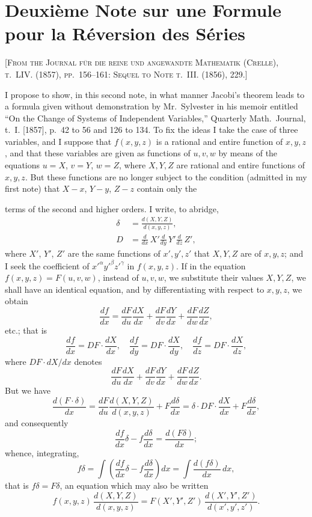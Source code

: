 \documentclass[11pt,a4paper]{book}
\begin{document}
\newpage


\section{Deuxième Note sur une Formule pour la Réversion des Séries}

\textsc{[From the Journal für die reine und angewandte Mathematik (Crelle), t.~LIV. (1857), pp.~156--161: Sequel to Note t.~III. (1856), 229.]}
\label{paper:234}

I propose to show, in this second note, in what manner Jacobi's theorem leads to a formula given without demonstration by Mr.~Sylvester in his memoir entitled ``On the Change of Systems of Independent Variables,'' Quarterly Math.\ Journal, t.~I. [1857], p.~42 to 56 and 126 to 134. To fix the ideas I take the case of three variables, and I suppose that $f(x,y,z)$ is a rational and entire function of $x,y,z$, and that these variables are given as functions of $u,v,w$ by means of the equations $u=X$, $v=Y$, $w=Z$, where $X,Y,Z$ are rational and entire functions of $x,y,z$. But these functions are no longer subject to the condition (admitted in my first note) that $X-x$, $Y-y$, $Z-z$ contain only the

\setcounter{page}{54}

terms of the second and higher orders. I write, to abridge,
\begin{align*}
\delta &= \frac{d(X,Y,Z)}{d(x,y,z)}, \\
D &= \frac{d}{dx}\,X'\frac{d}{dy}\,Y'\frac{d}{dz}\,Z',
\end{align*}
where $X'$, $Y'$, $Z'$ are the same functions of $x',y',z'$ that $X,Y,Z$ are of $x,y,z$; and I seek the coefficient of $x'^\alpha y'^\beta z'^\gamma$ in $f(x,y,z)$. If in the equation $f(x,y,z)=F(u,v,w)$, instead of $u,v,w$, we substitute their values $X,Y,Z$, we shall have an identical equation, and by differentiating with respect to $x,y,z$, we obtain
\[
\frac{df}{dx} = \frac{dF}{du}\frac{dX}{dx} + \frac{dF}{dv}\frac{dY}{dx} + \frac{dF}{dw}\frac{dZ}{dx},
\]
etc.; that is
\[
\frac{df}{dx} = DF \cdot \frac{dX}{dx}, \quad
\frac{df}{dy} = DF \cdot \frac{dX}{dy}, \quad
\frac{df}{dz} = DF \cdot \frac{dX}{dz},
\]
where $DF \cdot dX/dx$ denotes
\[
\frac{dF}{du}\frac{dX}{dx} + \frac{dF}{dv}\frac{dY}{dx} + \frac{dF}{dw}\frac{dZ}{dx}.
\]
But we have
\[
\frac{d(F\cdot\delta)}{dx}
= \frac{dF}{du}\frac{d(X,Y,Z)}{d(x,y,z)} + F\frac{d\delta}{dx}
= \delta \cdot DF\cdot\frac{dX}{dx} + F\frac{d\delta}{dx},
\]
and consequently
\[
\frac{df}{dx}\delta - f\frac{d\delta}{dx} = \frac{d(F\delta)}{dx};
\]
whence, integrating,
\[
f\delta = \int\left(\frac{df}{dx}\delta - f\frac{d\delta}{dx}\right)dx
= \int \frac{d(f\delta)}{dx}\,dx,
\]
that is $f\delta = F\delta$, an equation which may also be written
\[
f(x,y,z)\,\frac{d(X,Y,Z)}{d(x,y,z)} = F(X',Y',Z')\,\frac{d(X',Y',Z')}{d(x',y',z')}.
\]
\end{document}
